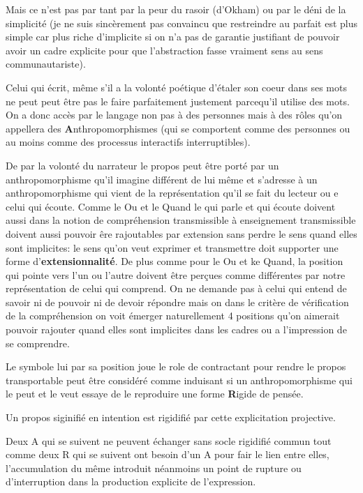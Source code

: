 \documentclass{article}
\begin{document}
Mais ce n'est pas par tant par la peur du rasoir (d'Okham) ou par le déni de la simplicité (je ne suis sincèrement pas convaincu que restreindre au parfait est plus simple car plus riche d'implicite si on n'a pas de garantie justifiant de pouvoir avoir un cadre explicite pour que l'abstraction fasse vraiment sens au sens communautariste).


Celui qui écrit, même s'il a la volonté poétique d'étaler son coeur dans ses mots ne peut peut être pas le faire parfaitement  justement parcequ'il  utilise des mots. On a donc accès par le langage non pas à des personnes mais à des rôles  qu'on appellera des \textbf{A}nthropomorphismes (qui se comportent comme des personnes ou au moins comme des processus interactifs interruptibles). 

De par la volonté du narrateur le propos peut être porté par un anthropomorphisme qu'il imagine différent de lui même et s'adresse à un anthropomorphisme qui vient de la représentation qu'il se fait du lecteur ou e celui qui écoute. Comme le Ou et le Quand  le qui parle et qui écoute doivent aussi dans la notion de compréhension transmissible à enseignement transmissible doivent aussi pouvoir êre rajoutables  par extension sans perdre le sens quand elles sont implicites: le sens qu'on veut exprimer et transmettre doit supporter une forme d'\textbf{extensionnalité}.  De plus comme pour le Ou et ke Quand,   la position qui pointe vers l'un ou l'autre doivent être perçues comme différentes par notre représentation  de celui qui comprend.
 On ne demande pas à celui qui entend de savoir ni de pouvoir ni de devoir répondre mais on dans le critère de vérification de la compréhension on voit émerger naturellement 4 positions qu'on aimerait pouvoir rajouter quand elles sont implicites dans les cadres ou a l'impression de se comprendre.


Le symbole lui par sa position joue le role de contractant pour rendre le propos transportable peut être considéré comme induisant  si un anthropomorphisme  qui le peut  et le veut essaye de le reproduire une forme \textbf{R}igide de pensée.

Un propos siginifié en intention est rigidifié par cette explicitation projective.

Deux A qui se suivent ne peuvent échanger sans socle rigidifié commun tout comme deux R qui se suivent ont besoin d'un A pour fair le lien entre elles, l'accumulation du même introduit néanmoins un point de rupture ou d'interruption dans la production explicite de l'expression.
 
\end{document}
